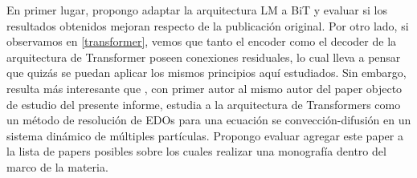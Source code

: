 \documentclass[titlepage,a4paper,oneside]{article}
\begin{document}
En primer lugar, propongo adaptar la arquitectura LM a BiT y evaluar si los resultados obtenidos mejoran respecto de la publicación original. Por otro lado, si observamos en \ref{transformer}, vemos que tanto el encoder como el decoder de la arquitectura de Transformer poseen conexiones residuales, lo cual lleva a pensar que quizás se puedan aplicar los mismos principios aquí estudiados. Sin embargo, resulta más interesante que \cite{lu2019understanding}, con primer autor al mismo autor del paper objecto de estudio del presente informe, estudia a la arquitectura de Transformers como un método de resolución de EDOs para una ecuación se convección-difusión en un sistema dinámico de múltiples partículas. Propongo evaluar agregar este paper a la lista de papers posibles sobre los cuales realizar una monografía dentro del marco de la materia.

\newpage

\printbibliography
\end{document}
